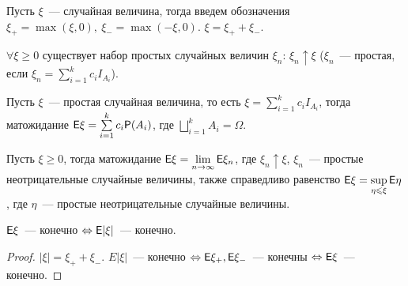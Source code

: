 \begin{definition}
    Пусть $\xi$~--- случайная величина, тогда введем обозначения $\xi_+ = \max(\xi, 0),\  \xi_- = \max(-\xi, 0)$. $\xi = \xi_+ + \xi_-$.
\end{definition}

\begin{lemma}[][б/д]
	$\forall \xi \geqslant 0$ существует набор простых случайных величин $\xi_n$: $\xi_n \uparrow \xi$ ($\xi_n$~--- простая, если $\xi_n = \sum\limits_{i = 1}^k c_iI_{A_i}$).
\end{lemma}

\begin{definition}
	Пусть $\xi$~--- простая случайная величина, то есть $\xi = \sum\limits_{i = 1}^k c_iI_{A_i}$, тогда матожидание $\mathsf{E} \xi = \sum\limits_{i = 1}^k c_i\mathsf{P}(A_i)$, где $\bigsqcup\limits_{i=1}^k A_i = \Omega$.
\end{definition}

\begin{definition}
	Пусть $\xi \geqslant 0$, тогда матожидание $\mathsf{E} \xi = \lim\limits_{n \rightarrow \infty} \mathsf{E} \xi_n$, где $\xi_n \uparrow \xi$, $\xi_n$~--- простые неотрицательные случайные величины, также справедливо равенство $\mathsf{E} \xi = \sup\limits_{\eta \leqslant \xi}\mathsf{E}\eta$, где $\eta$~--- простые неотрицательные случайные величины. 
\end{definition}

\begin{consequence}
	$\mathsf{E} \xi$~--- конечно $\Leftrightarrow \mathsf{E}|\xi|$~--- конечно.
	\begin{proof}
		$|\xi| = \xi_+ + \xi_-$. $E|\xi|$~--- конечно $\Leftrightarrow \mathsf{E}\xi_+, \mathsf{E}\xi_-$~--- конечны $\Leftrightarrow \mathsf{E}\xi$~--- конечно.
	\end{proof}
\end{consequence}

